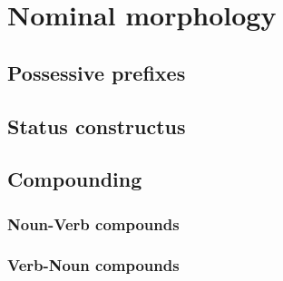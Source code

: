\chapter{Nominal morphology}
\section{Possessive prefixes}
\section{Status constructus}
\section{Compounding}
\subsection{Noun-Verb compounds}
\subsection{Verb-Noun compounds}

